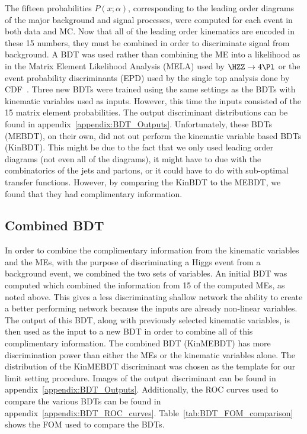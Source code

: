 The fifteen probabilities $P(x;\alpha)$, corresponding to the leading order diagrams of the major background and signal processes, were computed for each event in both data and MC.
Now that all of the leading order kinematics are encoded in these 15 numbers, they must be combined in order to discriminate signal from background.
A BDT was used rather than combining the ME into a likelihood as in the Matrix Element Likelihood Analysis (MELA) used by $\HZZ\rightarrow\text{4}\Pl$ or the event probability discriminants (EPD) used by the single top analysis done by CDF~\cite{Dong2008}.
Three new BDTs were trained using the same settings as the BDTs with kinematic variables used as inputs.
However, this time the inputs consisted of the 15 matrix element probabilities.
The output discriminant distributions can be found in appendix~\ref{appendix:BDT_Outputs}.
Unfortunately, these BDTs (MEBDT), on their own, did not out perform the kinematic variable based BDTs (KinBDT).
This might be due to the fact that we only used leading order diagrams (not even all of the diagrams), it might have to due with the combinatorics of the jets and partons, or it could have to do with sub-optimal transfer functions.
However, by comparing the KinBDT to the MEBDT, we found that they had complimentary information.

\subsection{Combined BDT}

In order to combine the complimentary information from the kinematic variables and the MEs, with the purpose of discriminating a Higgs event from a background event, we combined the two sets of variables.
An initial BDT was computed which combined the information from 15 of the computed MEs, as noted above.
This gives a less discriminating shallow network the ability to create a better performing network because the inputs are already non-linear variables.
The output of this BDT, along with previously selected kinematic variables, is then used as the input to a new BDT in order to combine all of this complimentary information.
The combined BDT (KinMEBDT) has more discrimination power than either the MEs or the kinematic variables alone.
The distribution of the KinMEBDT discriminant was chosen as the template for our limit setting procedure.
Images of the output discriminant can be found in appendix~\ref{appendix:BDT_Outputs}.
Additionally, the ROC curves used to compare the various BDTs can be found in appendix~\ref{appendix:BDT_ROC_curves}.
Table~\ref{tab:BDT_FOM_comparison} shows the FOM used to compare the BDTs.

